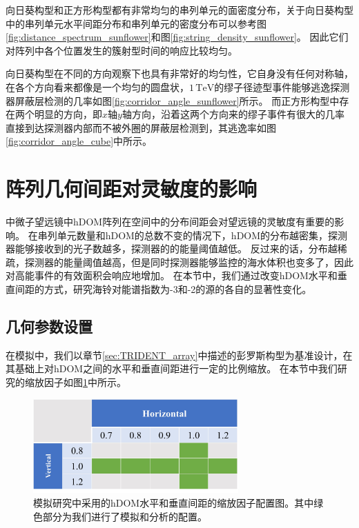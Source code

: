 向日葵构型和正方形构型都有非常均匀的串列单元的面密度分布，关于向日葵构型中的串列单元水平间距分布和串列单元的密度分布可以参考图\ref{fig:distance_spectrum_sunflower}和图\ref{fig:string_density_sunflower}。
因此它们对阵列中各个位置发生的簇射型时间的响应比较均匀。

向日葵构型在不同的方向观察下也具有非常好的均匀性，它自身没有任何对称轴，在各个方向看来都像是一个均匀的圆盘状，$1\,\mathrm{TeV}$的缪子径迹型事件能够逃逸探测器屏蔽层检测的几率如图\ref{fig:corridor_angle_sunflower}所示。
而正方形构型中存在两个明显的方向，即$x$轴$y$轴方向，沿着这两个方向来的缪子事件有很大的几率直接到达探测器内部而不被外圈的屏蔽层检测到，其逃逸率如图\ref{fig:corridor_angle_cube}中所示。

\section{阵列几何间距对灵敏度的影响}

中微子望远镜中hDOM阵列在空间中的分布间距会对望远镜的灵敏度有重要的影响\cite{IceCube-Gen2_sensitivity:2021, KM3NeT_spacing:2013}。
在串列单元数量和hDOM的总数不变的情况下，hDOM的分布越密集，探测器能够接收到的光子数越多，探测器的的能量阈值越低。
反过来的话，分布越稀疏，探测器的能量阈值越高，但是同时探测器能够监控的海水体积也变多了，因此对高能事件的有效面积会响应地增加。
在本节中，我们通过改变hDOM水平和垂直间距的方式，研究海铃对能谱指数为-3和-2的源的各自的显著性变化。

\subsection{几何参数设置}

在模拟中，我们以章节\ref{sec:TRIDENT_array}中描述的彭罗斯构型为基准设计，在其基础上对hDOM之间的水平和垂直间距进行一定的比例缩放。
在本节中我们研究的缩放因子如图\ref{fig:spacing_scale}中所示。

\begin{figure}[!htb]%
    \centering
    \includegraphics[width=0.70\textwidth]{img/spacing/spacing_scale.jpg}
    \caption{模拟研究中采用的hDOM水平和垂直间距的缩放因子配置图。其中绿色部分为我们进行了模拟和分析的配置。}
    \label{fig:spacing_scale}
\end{figure}

